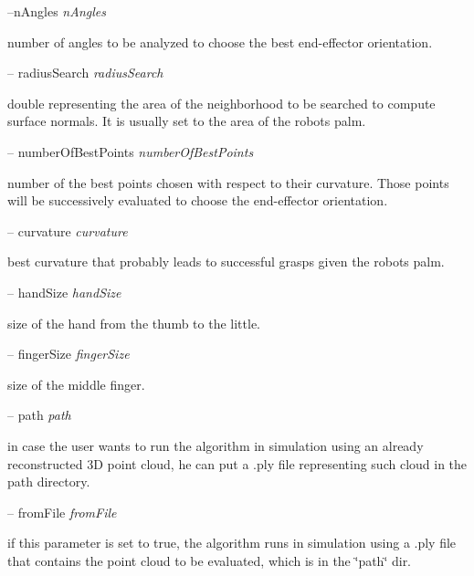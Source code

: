 --n\+Angles {\itshape n\+Angles} 
\begin{DoxyItemize}
\item number of angles to be analyzed to choose the best end-\/effector orientation.
\end{DoxyItemize}

-- radius\+Search {\itshape radius\+Search} 
\begin{DoxyItemize}
\item double representing the area of the neighborhood to be searched to compute surface normals. It is usually set to the area of the robot\textquotesingle{}s palm.
\end{DoxyItemize}

-- number\+Of\+Best\+Points {\itshape number\+Of\+Best\+Points} 
\begin{DoxyItemize}
\item number of the best points chosen with respect to their curvature. Those points will be successively evaluated to choose the end-\/effector orientation.
\end{DoxyItemize}

-- curvature {\itshape curvature} 
\begin{DoxyItemize}
\item best curvature that probably leads to successful grasps given the robot\textquotesingle{}s palm.
\end{DoxyItemize}

-- hand\+Size {\itshape hand\+Size} 
\begin{DoxyItemize}
\item size of the hand from the thumb to the little.
\end{DoxyItemize}

-- finger\+Size {\itshape finger\+Size} 
\begin{DoxyItemize}
\item size of the middle finger.
\end{DoxyItemize}

-- path {\itshape path} 
\begin{DoxyItemize}
\item in case the user wants to run the algorithm in simulation using an already reconstructed 3D point cloud, he can put a .ply file representing such cloud in the path directory.
\end{DoxyItemize}

-- from\+File {\itshape from\+File} 
\begin{DoxyItemize}
\item if this parameter is set to true, the algorithm runs in simulation using a .ply file that contains the point cloud to be evaluated, which is in the \char`\"{}path\char`\"{} dir.
\end{DoxyItemize}

